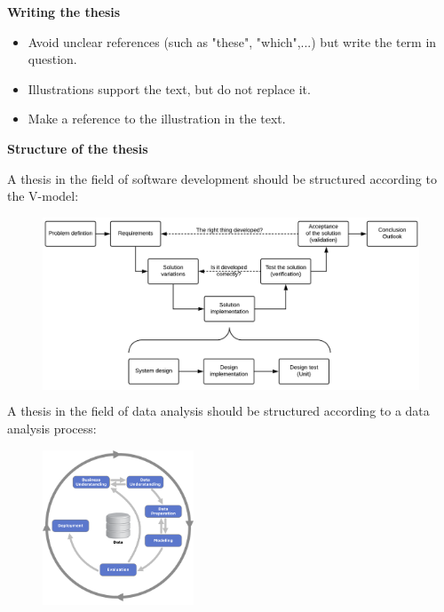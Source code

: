 \documentclass[]{cv-style} %
\begin{document}
\textbf{Writing the thesis}
\begin{itemize}[nosep]
	\item Avoid unclear references (such as "these", "which",...) but write the term in question.
	\item Illustrations support the text, but do not replace it.
	\item Make a reference to the illustration in the text.
\end{itemize}

\textbf{Structure of the thesis} 

A thesis in the field of software development should be structured according to the V-model:
	\begin{figure}[h]
	\centering
              \colorbox{white}{\includegraphics[width=\textwidth]{structure of the thesis.png}}
     \end{figure}

A thesis in the field of data analysis should be structured according to a data analysis process:
	\begin{figure}[h]
	\centering
              \colorbox{white}{\includegraphics[width=0.4\textwidth]{crispdm.png}}
     \end{figure}
\end{document}
